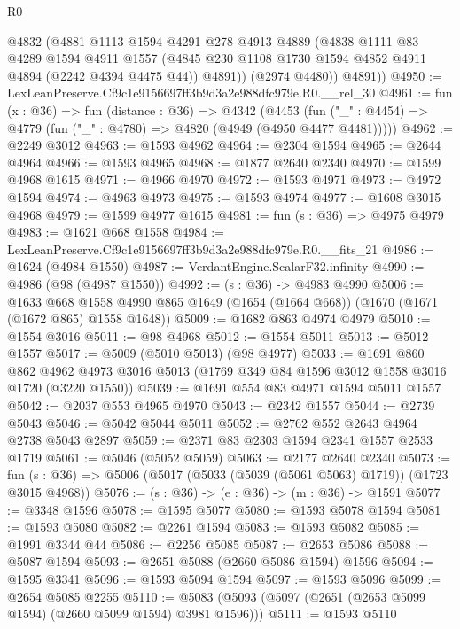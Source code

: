 \begin{lexlean}{R0}
\begin{coremodule}
          @4832
          (@4881
            @1113
            @1594
            @4291
            @278
            @4913
            @4889
            (@4838
              @1111
              @83
              @4289
              @1594
              @4911
              @1557
              (@4845 @230 @1108 @1730 @1594 @4852 @4911 @4894 (@2242 @4394 @4475 @44))
              @4891))
          (@2974 @4480))
        @4891))
@4950 := LexLeanPreserve.Cf9c1e9156697ff3b9d3a2e988dfc979e.R0.__rel_30
@4961 := fun (x : @36) =>
  fun (distance : @36) =>
  @4342
    (@4453 (fun ("_" : @4454) => @4779 (fun ("_" : @4780) => @4820 (@4949 (@4950 @4477 @4481)))))
@4962 := @2249 @3012
@4963 := @1593 @4962
@4964 := @2304 @1594
@4965 := @2644 @4964
@4966 := @1593 @4965
@4968 := @1877 @2640 @2340
@4970 := @1599 @4968 @1615
@4971 := @4966 @4970
@4972 := @1593 @4971
@4973 := @4972 @1594
@4974 := @4963 @4973
@4975 := @1593 @4974
@4977 := @1608 @3015 @4968
@4979 := @1599 @4977 @1615
@4981 := fun (s : @36) => @4975 @4979
@4983 := @1621 @668 @1558
@4984 := LexLeanPreserve.Cf9c1e9156697ff3b9d3a2e988dfc979e.R0.__fits_21
@4986 := @1624 (@4984 @1550)
@4987 := VerdantEngine.ScalarF32.infinity
@4990 := @4986 (@98 (@4987 @1550))
@4992 := (s : @36) -> @4983 @4990
@5006 := @1633
    @668
    @1558
    @4990
    @865
    @1649
    (@1654 (@1664 @668))
    (@1670 (@1671 (@1672 @865) @1558 @1648))
@5009 := @1682 @863 @4974 @4979
@5010 := @1554 @3016
@5011 := @98 @4968
@5012 := @1554 @5011
@5013 := @5012 @1557
@5017 := @5009 (@5010 @5013) (@98 @4977)
@5033 := @1691
    @860
    @862
    @4962
    @4973
    @3016
    @5013
    (@1769 @349 @84 @1596 @3012 @1558 @3016 @1720 (@3220 @1550))
@5039 := @1691 @554 @83 @4971 @1594 @5011 @1557
@5042 := @2037 @553 @4965 @4970
@5043 := @2342 @1557
@5044 := @2739 @5043
@5046 := @5042 @5044 @5011
@5052 := @2762 @552 @2643 @4964 @2738 @5043 @2897
@5059 := @2371 @83 @2303 @1594 @2341 @1557 @2533 @1719
@5061 := @5046 (@5052 @5059)
@5063 := @2177 @2640 @2340
@5073 := fun (s : @36) => @5006 (@5017 (@5033 (@5039 (@5061 @5063) @1719)) (@1723 @3015 @4968))
@5076 := (s : @36) -> (e : @36) -> (m : @36) -> @1591
@5077 := @3348 @1596
@5078 := @1595 @5077
@5080 := @1593 @5078 @1594
@5081 := @1593 @5080
@5082 := @2261 @1594
@5083 := @1593 @5082
@5085 := @1991 @3344 @44
@5086 := @2256 @5085
@5087 := @2653 @5086
@5088 := @5087 @1594
@5093 := @2651 @5088 (@2660 @5086 @1594) @1596
@5094 := @1595 @3341
@5096 := @1593 @5094 @1594
@5097 := @1593 @5096
@5099 := @2654 @5085 @2255
@5110 := @5083 (@5093 (@5097 (@2651 (@2653 @5099 @1594) (@2660 @5099 @1594) @3981 @1596)))
@5111 := @1593 @5110

\end{coremodule}
\end{lexlean}
